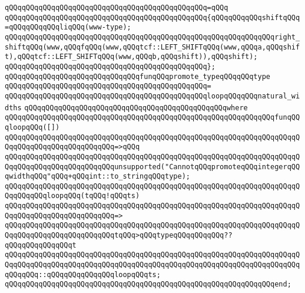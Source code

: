 \verb|qQQqqQQqqQQqqQQqqQQqqQQqqQQqqQQqqQQqqQQqqQQqqQQq=qQQq|\newline
\verb|qQQqqQQqqQQqqQQqqQQqqQQqqQQqqQQqqQQqqQQqqQQqqQQq{qQQqqQQqqQQqshiftqQQq=qQQqqQQqqQQqliqQQq(www-type);|\newline
\newline
\verb|qQQqqQQqqQQqqQQqqQQqqQQqqQQqqQQqqQQqqQQqqQQqqQQqqQQqqQQqqQQqqQQqright_shiftqQQq(www,qQQqfqQQq(www,qQQqtcf::LEFT_SHIFTqQQq(www,qQQqa,qQQqshift),qQQqtcf::LEFT_SHIFTqQQq(www,qQQqb,qQQqshift)),qQQqshift);|\newline
\verb|qQQqqQQqqQQqqQQqqQQqqQQqqQQqqQQqqQQqqQQqqQQqqQQq};|\newline
\newline
\verb|qQQqqQQqqQQqqQQqqQQqqQQqqQQqqQQqfunqQQqpromote_typeqQQqqQQqtype|\newline
\verb|qQQqqQQqqQQqqQQqqQQqqQQqqQQqqQQqqQQqqQQqqQQqqQQq=|\newline
\verb|qQQqqQQqqQQqqQQqqQQqqQQqqQQqqQQqqQQqqQQqqQQqqQQqloopqQQqqQQqnatural_widths|\newline
\verb|qQQqqQQqqQQqqQQqqQQqqQQqqQQqqQQqqQQqqQQqqQQqqQQqwhere|\newline
\verb|qQQqqQQqqQQqqQQqqQQqqQQqqQQqqQQqqQQqqQQqqQQqqQQqqQQqqQQqqQQqqQQqfunqQQqloopqQQq([])|\newline
\verb|qQQqqQQqqQQqqQQqqQQqqQQqqQQqqQQqqQQqqQQqqQQqqQQqqQQqqQQqqQQqqQQqqQQqqQQqqQQqqQQqqQQqqQQqqQQqqQQq=>qQQq|\newline
\verb|qQQqqQQqqQQqqQQqqQQqqQQqqQQqqQQqqQQqqQQqqQQqqQQqqQQqqQQqqQQqqQQqqQQqqQQqqQQqqQQqqQQqqQQqqQQqqQQqunsupported("CannotqQQqpromoteqQQqintegerqQQqwidthqQQq"qQQq+qQQqint::to_stringqQQqtype);|\newline
\newline
\verb|qQQqqQQqqQQqqQQqqQQqqQQqqQQqqQQqqQQqqQQqqQQqqQQqqQQqqQQqqQQqqQQqqQQqqQQqqQQqqQQqloopqQQq(tqQQq!qQQqts)|\newline
\verb|qQQqqQQqqQQqqQQqqQQqqQQqqQQqqQQqqQQqqQQqqQQqqQQqqQQqqQQqqQQqqQQqqQQqqQQqqQQqqQQqqQQqqQQqqQQqqQQq=>|\newline
\verb|qQQqqQQqqQQqqQQqqQQqqQQqqQQqqQQqqQQqqQQqqQQqqQQqqQQqqQQqqQQqqQQqqQQqqQQqqQQqqQQqqQQqqQQqqQQqqQQqtqQQq>qQQqtypeqQQqqQQqqQQq??qQQqqQQqqQQqqQQqt|\newline
\verb|qQQqqQQqqQQqqQQqqQQqqQQqqQQqqQQqqQQqqQQqqQQqqQQqqQQqqQQqqQQqqQQqqQQqqQQqqQQqqQQqqQQqqQQqqQQqqQQqqQQqqQQqqQQqqQQqqQQqqQQqqQQqqQQqqQQqqQQqqQQqqQQqqQQq::qQQqqQQqqQQqqQQqloopqQQqts;|\newline
\verb|qQQqqQQqqQQqqQQqqQQqqQQqqQQqqQQqqQQqqQQqqQQqqQQqqQQqqQQqqQQqqQQqend;|\newline
